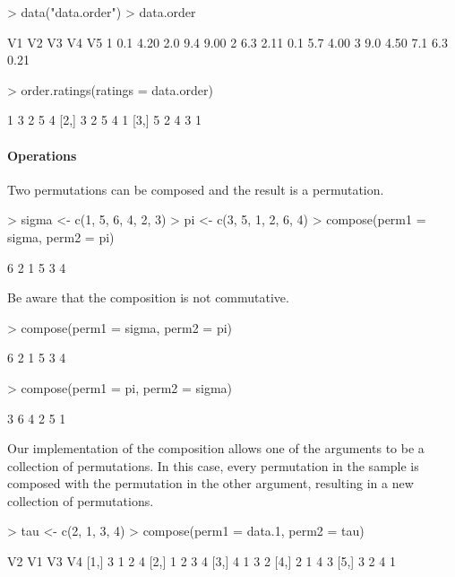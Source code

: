 \documentclass[article,nojss]{jss}
\begin{document}
\begin{Schunk}
\begin{Sinput}
> data("data.order")
> data.order
\end{Sinput}
\begin{Soutput}
   V1   V2  V3  V4   V5
1 0.1 4.20 2.0 9.4 9.00
2 6.3 2.11 0.1 5.7 4.00
3 9.0 4.50 7.1 6.3 0.21
\end{Soutput}
\begin{Sinput}
> order.ratings(ratings = data.order)
\end{Sinput}
\begin{Soutput}
     [,1] [,2] [,3] [,4] [,5]
[1,]    1    3    2    5    4
[2,]    3    2    5    4    1
[3,]    5    2    4    3    1
\end{Soutput}
\end{Schunk}

\paragraph{Operations} 
Two permutations can be composed and the result is a permutation. 
\begin{Schunk}
\begin{Sinput}
> sigma <- c(1, 5, 6, 4, 2, 3)
> pi <- c(3, 5, 1, 2, 6, 4)
> compose(perm1 = sigma, perm2 = pi)
\end{Sinput}
\begin{Soutput}
[1] 6 2 1 5 3 4
\end{Soutput}
\end{Schunk}

Be aware that the composition is not commutative. 
\begin{Schunk}
\begin{Sinput}
> compose(perm1 = sigma, perm2 = pi)
\end{Sinput}
\begin{Soutput}
[1] 6 2 1 5 3 4
\end{Soutput}
\begin{Sinput}
> compose(perm1 = pi, perm2 = sigma)
\end{Sinput}
\begin{Soutput}
[1] 3 6 4 2 5 1
\end{Soutput}
\end{Schunk}

Our implementation of the composition allows one of the arguments to be a collection of permutations. In this case, every permutation in the sample is composed with the permutation in the other argument, resulting in a new collection of permutations. 
\begin{Schunk}
\begin{Sinput}
> tau <- c(2, 1, 3, 4)
> compose(perm1 = data.1, perm2 = tau)
\end{Sinput}
\begin{Soutput}
     V2 V1 V3 V4
[1,]  3  1  2  4
[2,]  1  2  3  4
[3,]  4  1  3  2
[4,]  2  1  4  3
[5,]  3  2  4  1
\end{Soutput}
\end{Schunk}
\end{document}
